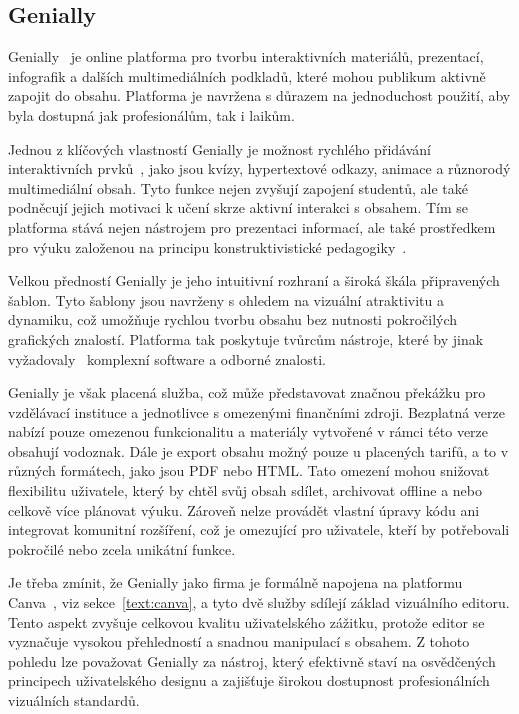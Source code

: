 \subsection{Genially}

Genially~\cite{genially} je online platforma pro tvorbu interaktivních materiálů, prezentací, infografik a dalších multimediálních podkladů, které mohou publikum aktivně zapojit do obsahu.
Platforma je navržena s důrazem na jednoduchost použití, aby byla dostupná jak profesionálům, tak i laikům.

Jednou z klíčových vlastností Genially je možnost rychlého přidávání interaktivních prvků~\cite{genially}, jako jsou kvízy, hypertextové odkazy, animace a různorodý multimediální obsah. 
Tyto funkce nejen zvyšují zapojení studentů, ale také podněcují jejich motivaci k učení skrze aktivní interakci s obsahem. 
Tím se platforma stává nejen nástrojem pro prezentaci informací, ale také prostředkem pro výuku založenou na principu konstruktivistické pedagogiky~\cite{konstruktivismus}. 

Velkou předností Genially je jeho intuitivní rozhraní a široká škála připravených šablon.
Tyto šablony jsou navrženy s ohledem na vizuální atraktivitu a dynamiku, což umožňuje rychlou tvorbu obsahu bez nutnosti pokročilých grafických znalostí.
Platforma tak poskytuje tvůrcům nástroje, které by jinak vyžadovaly~\cite{genially} komplexní software a odborné znalosti.

Genially je však placená služba, což může představovat značnou překážku pro vzdělávací instituce a jednotlivce s omezenými finančními zdroji. 
Bezplatná verze nabízí pouze omezenou funkcionalitu a materiály vytvořené v rámci této verze obsahují vodoznak.
Dále je export obsahu možný pouze u placených tarifů, a to v různých formátech, jako jsou PDF nebo HTML. 
Tato omezení mohou snižovat flexibilitu uživatele, který by chtěl svůj obsah sdílet, archivovat offline a nebo celkově více plánovat výuku. 
Zároveň nelze provádět vlastní úpravy kódu ani integrovat komunitní rozšíření, což je omezující pro uživatele, kteří by potřebovali pokročilé nebo zcela unikátní funkce.

Je třeba zmínit, že Genially jako firma je formálně napojena na platformu Canva~\cite{genially}, viz sekce~\ref{text:canva}, a tyto dvě služby sdílejí základ vizuálního editoru. 
Tento aspekt zvyšuje celkovou kvalitu uživatelského zážitku, protože editor se vyznačuje vysokou přehledností a snadnou manipulací s obsahem. 
Z tohoto pohledu lze považovat Genially za nástroj, který efektivně staví na osvědčených principech uživatelského designu a zajišťuje širokou dostupnost profesionálních vizuálních standardů.


